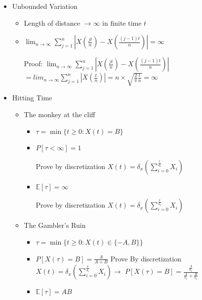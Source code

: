 \documentclass[a4paper]{article}
\begin{document}
\begin{itemize}
\begin{itemize}
\begin{itemize}
                \end{itemize}
            \item Unbounded Variation
                \begin{itemize}
                    \item Length of distance $\rightarrow \infty$ in finite time $t$
                    \item $\lim_{n \rightarrow \infty} \sum_{j=1}^n |X(\frac{jt}{n}) - X(\frac{(j-1)t}{n})| = \infty$

                        Proof: $\lim_{n \rightarrow \infty} \sum_{j=1}^n |X(\frac{jt}{n}) - X(\frac{(j-1)t}{n})|$
                        $= lim_{n \rightarrow \infty} \sum_{j=1}^n |X(\frac{t}{n})| = n \times \sqrt{\frac{2}{\pi} \frac{t}{n}} = \infty$
                \end{itemize}
            \item Hitting Time
                \begin{itemize}
                    \item The monkey at the cliff
                        \begin{itemize}
                            \item $\tau = \min\{t \geq 0: X(t) = B\}$
                            \item $P[\tau < \infty] = 1$

                                Prove by discretization $X(t) = \delta_x (\sum_{i=0}^{\frac{t}{\delta_t}} X_i)$
                            \item $\mathbb{E}[\tau] = \infty$

                                Prove by discretization $X(t) = \delta_x (\sum_{i=0}^{\frac{t}{\delta_t}} X_i)$
                        \end{itemize}
                    \item The Gambler's Ruin
                        \begin{itemize}
                            \item $\tau = \min\{t \geq 0: X(t) \in \{-A, B\}\}$
                            \item $P[X(\tau) = B] = \frac{A}{A+B}$
                                Prove By discretization $X(t) = \delta_x (\sum_{i=0}^{\frac{t}{\delta_t}} X_i) \rightarrow$
                                $P[X(\tau) = B] = \frac{\frac{A}{\delta_x}}{\frac{A}{\delta_x} + \frac{B}{\delta_x}}$
                            \item $\mathbb{E}[\tau] = AB$


\end{itemize}
\end{itemize}
\end{itemize}
\end{itemize}
\end{document}
